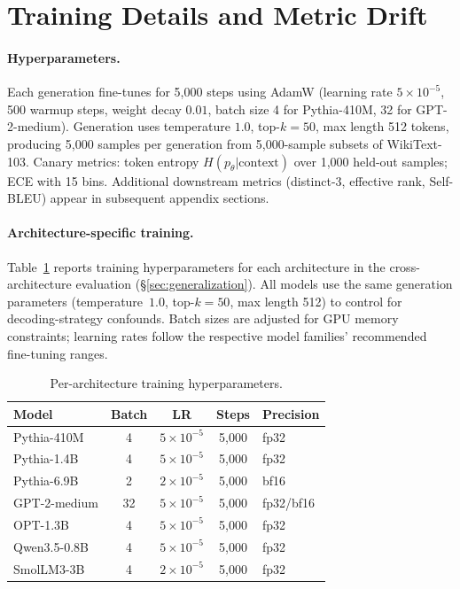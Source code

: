 \appendix

\section{Training Details and Metric Drift}
\label{app:training_details}
\label{app:drift}

\paragraph{Hyperparameters.}
Each generation fine-tunes for 5{,}000 steps using AdamW (learning rate $5 \times 10^{-5}$, 500 warmup steps, weight decay $0.01$, batch size 4 for Pythia-410M, 32 for GPT-2-medium).
Generation uses temperature $1.0$, top-$k{=}50$, max length 512 tokens, producing 5{,}000 samples per generation from 5{,}000-sample subsets of WikiText-103.
Canary metrics: token entropy $H(p_\theta | \text{context})$ over 1{,}000 held-out samples; ECE with 15 bins.
Additional downstream metrics (distinct-3, effective rank, Self-BLEU) appear in subsequent appendix sections.

\paragraph{Architecture-specific training.}
Table~\ref{tab:arch_hyperparams} reports training hyperparameters for each architecture in the cross-architecture evaluation (\S\ref{sec:generalization}).
All models use the same generation parameters (temperature~$1.0$, top-$k{=}50$, max length 512) to control for decoding-strategy confounds.
Batch sizes are adjusted for GPU memory constraints; learning rates follow the respective model families' recommended fine-tuning ranges.

\begin{table}[H]
\centering
\small
\caption{Per-architecture training hyperparameters.}
\label{tab:arch_hyperparams}
\begin{tabular}{lcccl}
\toprule
Model & Batch & LR & Steps & Precision \\
\midrule
Pythia-410M & 4 & $5{\times}10^{-5}$ & 5{,}000 & fp32 \\
Pythia-1.4B & 4 & $5{\times}10^{-5}$ & 5{,}000 & fp32 \\
Pythia-6.9B & 2 & $2{\times}10^{-5}$ & 5{,}000 & bf16 \\
GPT-2-medium & 32 & $5{\times}10^{-5}$ & 5{,}000 & fp32/bf16 \\
OPT-1.3B & 4 & $5{\times}10^{-5}$ & 5{,}000 & fp32 \\
Qwen3.5-0.8B & 4 & $5{\times}10^{-5}$ & 5{,}000 & fp32 \\
SmolLM3-3B & 4 & $2{\times}10^{-5}$ & 5{,}000 & fp32 \\
\bottomrule
\end{tabular}
\end{table}

